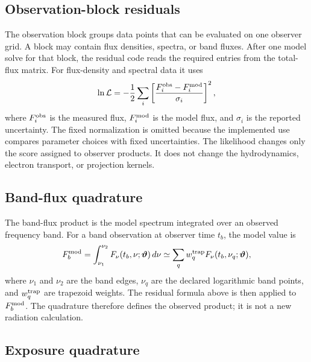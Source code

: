 \documentclass[twocolumn]{aastex702}
\begin{document}
\subsection{Observation-block residuals}

The observation block groups data points that can be evaluated on one observer
grid.  A block may contain flux densities, spectra, or band fluxes.  After one
model solve for that block, the residual code reads the required entries from
the total-flux matrix.  For flux-density and spectral data it uses
\begin{equation}
\ln\mathcal{L}
=-\frac{1}{2}\sum_i
\left[
\frac{F_i^{\rm obs}-F_i^{\rm mod}}{\sigma_i}
\right]^2 ,
\end{equation}
where \(F_i^{\rm obs}\) is the measured flux, \(F_i^{\rm mod}\) is the model
flux, and \(\sigma_i\) is the reported uncertainty.  The fixed normalization is
omitted because the implemented use compares parameter choices with fixed
uncertainties.  The likelihood changes only the score assigned to observer
products.  It does not change the hydrodynamics, electron transport, or
projection kernels.

\subsection{Band-flux quadrature}

The band-flux product is the model spectrum integrated over an observed
frequency band.  For a band observation at observer time \(t_b\), the model value
is
\begin{equation}
F_b^{\rm mod}
=\int_{\nu_1}^{\nu_2}F_\nu(t_b,\nu;\boldsymbol{\vartheta})\,d\nu
\simeq
\sum_q w_q^{\rm trap}
F_\nu(t_b,\nu_q;\boldsymbol{\vartheta}) ,
\end{equation}
where \(\nu_1\) and \(\nu_2\) are the band edges, \(\nu_q\) are the declared
logarithmic band points, and \(w_q^{\rm trap}\) are trapezoid weights.  The
residual formula above is then applied to \(F_b^{\rm mod}\).  The quadrature
therefore defines the observed product; it is not a new radiation calculation.

\subsection{Exposure quadrature}
\end{document}
